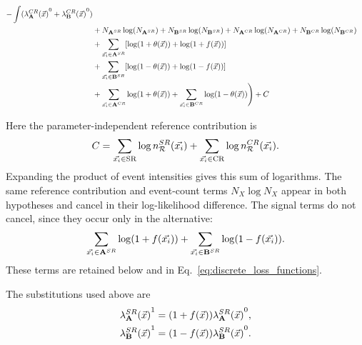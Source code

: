 \documentclass[paper/ddppaper2.tex]{subfiles}
\begin{document}
{\begin{wideequations}
\begin{equation}
\begin{aligned}
            - \int (\crdist{\dataset{A}}^0 + \crdist{\dataset{B}}^0)
        \\&
        + N_{\srdataset{A}}\log({N_\srdataset{A}})
        + N_{\srdataset{B}}\log({N_\srdataset{B}})
        + N_{\crdataset{A}}\log({N_\crdataset{A}})
        + N_{\crdataset{B}}\log({N_\crdataset{B}})
        \\&
        + \sum\limits_{\event \in \srdataset{A}} [\log(1 + {\nparam(\anyevent)}) + \log(1 + f(\anyevent))]
        \\& + \sum\limits_{\event \in \srdataset{B}} [\log(1 - {\nparam(\anyevent)}) + \log(1 - f(\anyevent))] \\&
        + \sum\limits_{\event \in \crdataset{A}} \log(1 + {\nparam(\anyevent)})
        + \sum\limits_{\event \in \crdataset{B}} \log(1 - {\nparam(\anyevent)})
    \Bigg) + C
\end{aligned}
\end{equation}
\end{wideequations}
}

\noindent Here the parameter-independent reference contribution is
\begin{equation}
    C = \sum_{\event\in\mathrm{SR}}\log \srrefdist[\event]
      + \sum_{\event\in\mathrm{CR}}\log \crrefdist[\event].
\end{equation}
Expanding the product of event intensities gives this sum of logarithms.
The same reference contribution and event-count terms $N_X\log N_X$
appear in both hypotheses and cancel in their log-likelihood difference.
The signal terms do not cancel, since they occur only in the alternative:
\begin{equation*}
    \sum_{\event\in\srdataset{A}}\log(1+f(\event))
    + \sum_{\event\in\srdataset{B}}\log(1-f(\event)).
\end{equation*}
These terms are retained below and in Eq.~\ref{eq:discrete_loss_functions}.

\noindent The substitutions used above are
\begin{equation*}
\begin{aligned}
\srdist{\dataset{A}}^1 = (1 + f(\anyevent))\srdist{\dataset{A}}^0, \\
\srdist{\dataset{B}}^1 = (1 - f(\anyevent))\srdist{\dataset{B}}^0.
\end{aligned}
\end{equation*}
\end{document}
